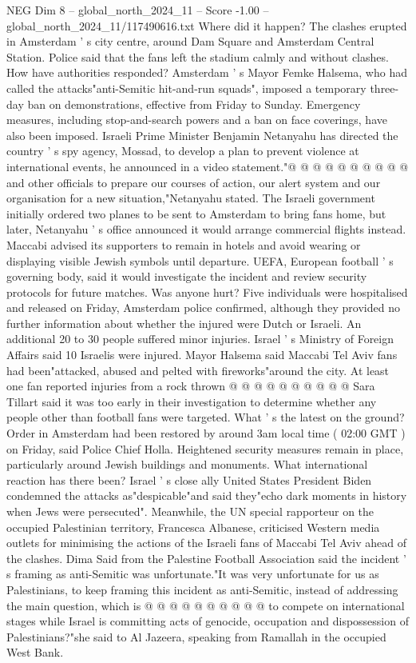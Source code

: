 \begin{textsample}{NEG Dim 8 – global\_north\_2024\_11 – Score -1.00 – global\_north\_2024\_11/117490616.txt}
Where did it happen?
The clashes erupted in Amsterdam ' s city centre, around Dam Square and Amsterdam Central Station.
Police said that the fans left the stadium calmly and without clashes.
How have authorities responded?
Amsterdam ' s Mayor Femke Halsema, who had called the attacks"anti-Semitic hit-and-run squads", imposed a temporary three-day ban on demonstrations, effective from Friday to Sunday.
Emergency measures, including stop-and-search powers and a ban on face coverings, have also been imposed.
Israeli Prime Minister Benjamin Netanyahu has directed the country ' s spy agency, Mossad, to develop a plan to prevent violence at international events, he announced in a video statement."@ @ @ @ @ @ @ @ @ @ and other officials to prepare our courses of action, our alert system and our organisation for a new situation,"Netanyahu stated.
The Israeli government initially ordered two planes to be sent to Amsterdam to bring fans home, but later, Netanyahu ' s office announced it would arrange commercial flights instead.
Maccabi advised its supporters to remain in hotels and avoid wearing or displaying visible Jewish symbols until departure.
UEFA, European football ' s governing body, said it would investigate the incident and review security protocols for future matches.
Was anyone hurt?
Five individuals were hospitalised and released on Friday, Amsterdam police confirmed, although they provided no further information about whether the injured were Dutch or Israeli.
An additional 20 to 30 people suffered minor injuries.
Israel ' s Ministry of Foreign Affairs said 10 Israelis were injured.
Mayor Halsema said Maccabi Tel Aviv fans had been"attacked, abused and pelted with fireworks"around the city.
At least one fan reported injuries from a rock thrown @ @ @ @ @ @ @ @ @ @ Sara Tillart said it was too early in their investigation to determine whether any people other than football fans were targeted.
What ' s the latest on the ground?
Order in Amsterdam had been restored by around 3am local time ( 02:00 GMT ) on Friday, said Police Chief Holla.
Heightened security measures remain in place, particularly around Jewish buildings and monuments.
What international reaction has there been?
Israel ' s close ally United States President Biden condemned the attacks as"despicable"and said they"echo dark moments in history when Jews were persecuted".
Meanwhile, the UN special rapporteur on the occupied Palestinian territory, Francesca Albanese, criticised Western media outlets for minimising the actions of the Israeli fans of Maccabi Tel Aviv ahead of the clashes.
Dima Said from the Palestine Football Association said the incident ' s framing as anti-Semitic was unfortunate."It was very unfortunate for us as Palestinians, to keep framing this incident as anti-Semitic, instead of addressing the main question, which is @ @ @ @ @ @ @ @ @ @ to compete on international stages while Israel is committing acts of genocide, occupation and dispossession of Palestinians?"she said to Al Jazeera, speaking from Ramallah in the occupied West Bank.

\end{textsample}
